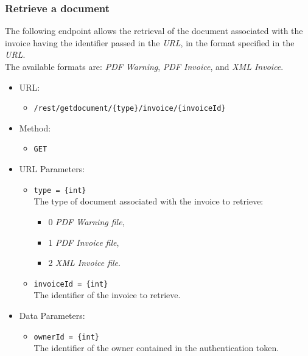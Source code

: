 \begin{itemize}
\end{itemize}


\newpage
\subsubsection*{Retrieve a document}

The following endpoint allows the retrieval of the document associated with the invoice having the identifier passed in the \textit{URL}, in the format specified in the \textit{URL}. \\
The available formats are: \textit{PDF Warning}, \textit{PDF Invoice}, and \textit{XML Invoice}.

\begin{itemize}

    \item URL:
    \begin{itemize}
        \item \texttt{/rest/getdocument/\{type\}/invoice/\{invoiceId\}}
    \end{itemize}

    \item Method:
    \begin{itemize}
        \item \texttt{GET}
    \end{itemize}

    \item URL Parameters:
    \begin{itemize}
        \item \texttt{type = \{int\}} \\
        The type of document associated with the invoice to retrieve:
        \begin{itemize}
            \item 0 \textrightarrow \textit{PDF Warning file},
            \item 1 \textrightarrow \textit{PDF Invoice file},
            \item 2 \textrightarrow \textit{XML Invoice file}.
        \end{itemize}
        \item \texttt{invoiceId = \{int\}} \\
        The identifier of the invoice to retrieve.
    \end{itemize}

    \item Data Parameters:
    \begin{itemize}
        \item \texttt{ownerId = \{int\}} \\
        The identifier of the owner contained in the authentication token.
    \end{itemize}


\end{itemize}
